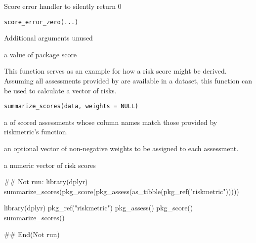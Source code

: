 \documentclass[a4paper]{book}
\begin{document}
%
\begin{Description}
Score error handler to silently return 0
\end{Description}
%
\begin{Usage}
\begin{verbatim}
score_error_zero(...)
\end{verbatim}
\end{Usage}
%
\begin{Arguments}
\begin{ldescription}
\item[\code{...}] Additional arguments unused
\end{ldescription}
\end{Arguments}
%
\begin{Value}
a value of package score
\end{Value}
%
\begin{Description}
This function serves as an example for how a risk score might be derived.
Assuming all assessments provided by  are available in a
dataset, this function can be used to calculate a vector of risks.
\end{Description}
%
\begin{Usage}
\begin{verbatim}
summarize_scores(data, weights = NULL)
\end{verbatim}
\end{Usage}
%
\begin{Arguments}
\begin{ldescription}
\item[\code{data}] a  of scored assessments whose column
names match those provided by riskmetric's  function.

\item[\code{weights}] an optional vector of non-negative weights to be assigned to
each assessment.
\end{ldescription}
\end{Arguments}
%
\begin{Value}
a numeric vector of risk scores
\end{Value}
%
\begin{Examples}
\begin{ExampleCode}
## Not run: 
library(dplyr)
summarize_scores(pkg_score(pkg_assess(as_tibble(pkg_ref("riskmetric")))))

library(dplyr)
pkg_ref("riskmetric") %
  pkg_assess() %
  pkg_score() %
  summarize_scores()

## End(Not run)

\end{ExampleCode}
\end{Examples}
\end{document}
